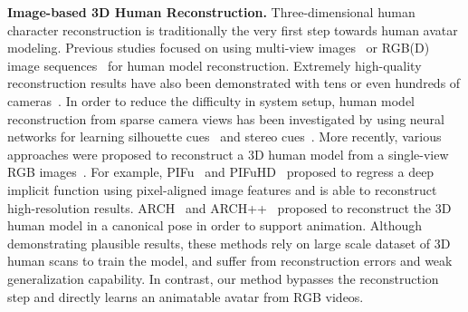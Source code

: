 \textbf{Image-based 3D Human Reconstruction.} 
Three-dimensional human character reconstruction is traditionally the very first step towards human avatar modeling. Previous studies focused on using multi-view images~\cite{StarckCGA07,liu2009point,WuShadingHuman,WaschbuschWCSG05,VlasicPBDPRM09} or RGB(D) image sequences~\cite{alldieck2018videoavatar,alldieck2018videoavatar_detailed,yu2017BodyFusion,yu2018doublefusion,Zheng2018HybridFusion,bogo2015detailed,dou2016fusion4d,Motion2Fusion,yu2021function4d,Xiang2020MonoClothCap,habermann2019livecap,Xu2020UnstructuredFusion,guo2017real} for human model reconstruction. Extremely high-quality reconstruction results have also been demonstrated with tens or even hundreds of cameras~\cite{collet2015high}. In order to reduce the difficulty in system setup, human model reconstruction from sparse camera views has been investigated by using neural networks for learning silhouette cues~\cite{MinimalCam18,natsume2019siclope} and stereo cues~\cite{SparseViewHaoLi18}. More recently, various approaches were proposed to reconstruct a 3D human model from a single-view RGB images~\cite{saito2019pifu,saito2020pifuhd,zheng2020pamir,gabeur2019moulding,wang2020normalgan,zhu2019hmd,alldieck2019tex2shape,ARCH2020,He2021archplusplus}. For example, PIFu~\cite{saito2019pifu} and PIFuHD~\cite{saito2020pifuhd} proposed to regress a deep implicit function using pixel-aligned image features and is able to reconstruct high-resolution results. ARCH~\cite{ARCH2020} and ARCH++~\cite{He2021archplusplus} proposed to reconstruct the 3D human model in a canonical pose in order to support animation. Although demonstrating plausible results, these methods rely on large scale dataset of 3D human scans to train the model, and suffer from reconstruction errors and weak generalization capability. In contrast, our method bypasses the reconstruction step and directly learns an animatable avatar from RGB videos. 



